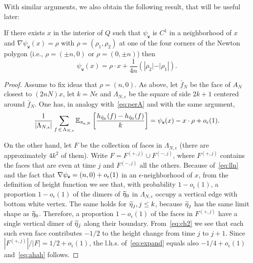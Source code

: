 \documentclass[AHL,Unicode,longabstracts,published]{cedram}
\newcommand{\psiw}{\psi_{\mathtt w}}
\newcommand{\ttw}{\mathtt{w}}
\newcommand{\bbE}{\mathbb{E}}
\let\oldtilde\tilde
\renewcommand*{\tilde}[1]{\mathchoice{\widetilde{#1}}{\widetilde{#1}}{\oldtilde{#1}}{\oldtilde{#1}}}
\newcommand{\ttw}{\mathtt{w}}
\begin{document}
With similar arguments, we also obtain the following result, that will be useful later:
\begin{prop}\label{prop:damettere}
If there exists $x$ in the interior of $Q$ such that $\psi_{\ttw}$ is $C^1$ in a neighborhood of $x$ and $\nabla\psi_{\ttw}(x)=\rho$ with $\rho=(\rho_1,\rho_2)$ at one of the four corners of the Newton polygon (i.e., $\rho=(\pm n,0)$ or $\rho=(0,\pm n)$) then
\begin{equation}\label{eq:ahah}
\psi_{\ttw}(x)=\rho\cdot x+\frac1{4n}\left(\left|\rho_2|-|\rho_1\right|\right).
\end{equation}
\end{prop}

\begin{proof}
Assume to fix ideas that $\rho=(n,0)$. As above, let $\bar f_N$ be the face of $A_N$ closest to $(2n N) x$, let $k=N\epsilon$ and $\Lambda_{N,\epsilon}$ be the square of side $2k+1$ centered around $\bar f_N$. One has, in analogy with~\eqref{eq:perA} and with the same argument,
\begin{equation}\label{eq:expand}
\frac1{\left|\Lambda_{N,\epsilon}\right|}\sum_{f\,\in\,\Lambda_{N,\epsilon}} \bbE_{\pi_{\ttw,N}}\left[\frac{ h_{\tilde \eta_k}(f)-h_{\tilde \eta_0}(f)}k\right]= \psi_{\ttw}(x)-x\cdot \rho+o_\epsilon(1).
\end{equation}

On the other hand, let $F$ be the collection of faces in $\Lambda_{N,\epsilon}$ (there are approximately $4 k^2$ of them). Write $F=F^{(+,j)}\cup F^{(-,j)}$, where $F^{(+,j)}$ contains the faces that are even at time $j$ and $F^{(-,j)}$ all the others. Because of~\eqref{eq:lln} and the fact that $\nabla\psiw\linebreak =(n,0)+o_\epsilon(1)$ in an $\epsilon$-neighborhood of $x$, from the definition of height function we see that, with probability $1-o_\epsilon(1)$, a proportion $1-o_\epsilon(1)$ of the dimers of $\tilde \eta_0$ in $\Lambda_{N,\epsilon}$ occupy a vertical edge with bottom white vertex. The same holds for $\tilde \eta_j,j\le k$, because $\tilde \eta_j$ has the same limit shape as $\tilde \eta_0$. Therefore, a proportion $1-o_\epsilon(1)$ of the faces in $F^{(+,j)}$ have a single vertical dimer of $\tilde \eta_j$ along their boundary. From~\eqref{eq:ch2} we see that each such even face contributes $-1/2$ to the height change from time $j$ to $j+1$. Since $|F^{(+,j)}|/|F|=1/2+o_\epsilon(1)$, the l.h.s. of~\eqref{eq:expand} equals also $-1/4+o_\epsilon(1)$ and~\eqref{eq:ahah} follows.
\end{proof}
\end{document}

